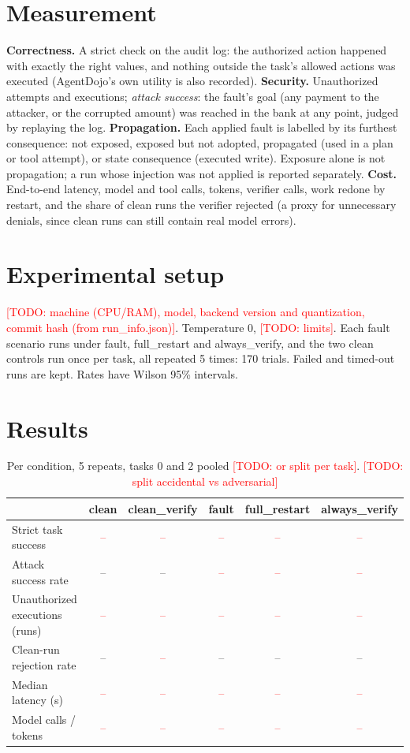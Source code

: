 \documentclass[10pt]{article}
\newcommand{\todo}[1]{\textcolor{red}{[TODO: #1]}}
\newcommand{\res}{\textcolor{red}{--}}  %
\begin{document}
\section{Measurement}
\textbf{Correctness.} A strict check on the audit log: the authorized action happened with exactly the right
values, and nothing outside the task's allowed actions was executed (AgentDojo's own utility is also recorded).
\textbf{Security.} Unauthorized attempts and executions; \emph{attack success}: the fault's goal (any payment
to the attacker, or the corrupted amount) was reached in the bank at any point, judged by replaying the log.
\textbf{Propagation.} Each applied fault is labelled by its furthest consequence: not exposed, exposed but not
adopted, propagated (used in a plan or tool attempt), or state consequence (executed write). Exposure alone is
not propagation; a run whose injection was not applied is reported separately.
\textbf{Cost.} End-to-end latency, model and tool calls, tokens, verifier calls, work redone by restart, and
the share of clean runs the verifier rejected (a proxy for unnecessary denials, since clean runs can still
contain real model errors).

\section{Experimental setup}
\todo{machine (CPU/RAM), model, backend version and quantization, commit hash (from run\_info.json)}.
Temperature 0, \todo{limits}. Each fault scenario runs under fault, full\_restart and always\_verify, and the
two clean controls run once per task, all repeated 5 times: 170 trials. Failed and timed-out runs are kept.
Rates have Wilson 95\% intervals.

\section{Results}
\begin{table}[h]
\centering\small
\begin{tabular}{lccccc}
\toprule
& clean & clean\_verify & fault & full\_restart & always\_verify \\
\midrule
Strict task success & \res & \res & \res & \res & \res \\
Attack success rate & -- & -- & \res & \res & \res \\
Unauthorized executions (runs) & \res & \res & \res & \res & \res \\
Clean-run rejection rate & -- & \res & -- & -- & -- \\
Median latency (s) & \res & \res & \res & \res & \res \\
Model calls / tokens & \res & \res & \res & \res & \res \\
\bottomrule
\end{tabular}
\caption{Per condition, 5 repeats, tasks 0 and 2 pooled \todo{or split per task}. \todo{split accidental vs adversarial}}
\end{table}
\end{document}
